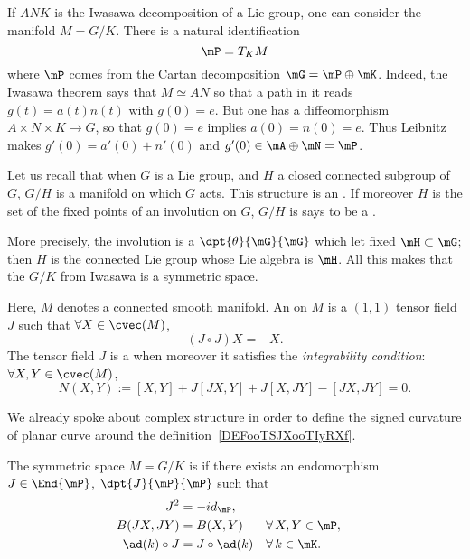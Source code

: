 If $ANK$ is the Iwasawa decomposition of a Lie group, one can consider the manifold $M=G/K$. There is a natural identification
\[
   \mP=T_KM
\]
where $\mP$ comes from the Cartan decomposition $\mG=\mP\oplus\mK$. Indeed, the Iwasawa theorem says that $M\simeq AN$ so that a path in it reads $g(t)=a(t)n(t)$ with $g(0)=e$. But one has a diffeomorphism $A\times N\times K\to G$, so that $g(0)=e$ implies $a(0)=n(0)=e$. Thus Leibnitz makes $g'(0)=a'(0)+n'(0)$ and $g'(0)\in\mA\oplus\mN=\mP$.

Let us recall that when $G$ is a Lie group, and $H$ a closed connected subgroup of $G$, $G/H$ is a manifold on which $G$ acts. This structure is an . If moreover $H$ is the set of the fixed points of an involution on $G$, $G/H$ is says to be a .

More precisely, the involution is a $\dpt{\theta}{\mG}{\mG}$ which let fixed $\mH\subset\mG$; then $H$ is the connected Lie group whose Lie algebra is $\mH$. All this makes that the $G/K$ from Iwasawa is a symmetric space.

\begin{definition}  \label{DefCLtjFtD}
    Here, $M$ denotes a connected smooth manifold. An  on $M$ is a $(1,1)$ tensor field $J$ such that $\forall X\in\cvec(M)$,
    \begin{equation}
       (J\circ J)X=-X.
    \end{equation}
    The tensor field $J$ is a  when moreover it satisfies the \emph{integrability condition}: $\forall X,Y\in\cvec(M)$,
    \begin{equation}  \label{DefComplStruct}
       N(X,Y):=[X,Y]+J[JX,Y]+J[X,JY]-[JX,JY]=0.
    \end{equation}
\end{definition}
We already spoke about complex structure in order to define the signed curvature of planar curve around the definition~\ref{DEFooTSJXooTIyRXf}.

\begin{definition}		\label{DefSymHermMGKalg}
  The symmetric space $M=G/K$ is  if there exists an endomorphism $J\in\End{\mP}$, $\dpt{J}{\mP}{\mP}$ such that
\begin{subequations}
\begin{align}
  J^2&=-id_{\mP},                                           \label{eq:herm_1} \\
  B(JX,JY)&=B(X,Y)            && \forall\,X,Y\in\mP,    \label{eq:herm_2}\\
  \ad (k)\circ J&=J\circ\ad(k)&& \forall\,k\in\mK.      \label{eq:herm_3}
\end{align}
\end{subequations}
\label{def:hermitien}
\end{definition}

